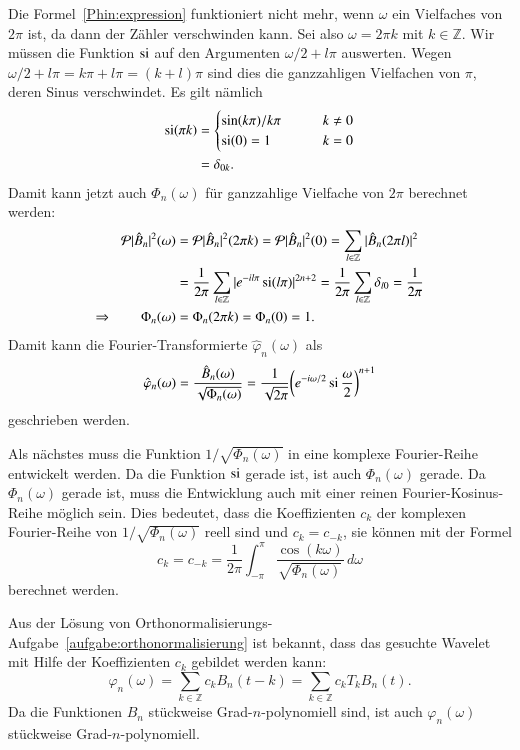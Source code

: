 Die Formel~\eqref{Phin:expression} funktioniert nicht mehr, wenn $\omega$
ein Vielfaches von $2\pi$ ist, da dann der Zähler verschwinden kann.
Sei also $\omega = 2\pi k$ mit $k\in\mathbb Z$.
Wir müssen die Funktion $\si$ auf den Argumenten
$\omega/2+l\pi$ auswerten.
Wegen $\omega/2 + l\pi=k\pi + l\pi = (k+l)\pi$ sind dies die ganzzahligen
Vielfachen von $\pi$, deren Sinus verschwindet.
Es gilt nämlich
\begin{align*}
\si (\pi k)
&=
\begin{cases}
\sin(k\pi)/k\pi&\qquad k\ne 0\\
\si(0)=1&\qquad k=0
\end{cases}
\\
&=
\delta_{0k}.
\end{align*}
Damit kann jetzt auch $\Phi_n(\omega)$ für ganzzahlige Vielfache von $2\pi$ 
berechnet werden:
\begin{align*}
\mathcal{P}|\hat{B}_n|^2(\omega)
&=
\mathcal{P}|\hat{B}_n|^2(2\pi k)
=
\mathcal{P}|\hat{B}_n|^2(0)
=
\sum_{l\in\mathbb Z} |\hat{B}_n(2\pi l)|^2
\\
&=
\frac1{2\pi}
\sum_{l\in\mathbb Z} |e^{-il\pi}\si(l\pi)|^{2n+2}
=
\frac1{2\pi}
\sum_{l\in\mathbb Z} \delta_{l0}
=
\frac1{2\pi}
\\
\Rightarrow\qquad
\Phi_n(\omega)
&=
\Phi_n(2\pi k)
=
\Phi_n(0)=1.
\end{align*}
Damit kann die Fourier-Transformierte $\hat{\varphi}_n(\omega)$ als
\[
\hat{\varphi}_n(\omega)
=
\frac{\hat{B}_n(\omega)}{\sqrt{\Phi_n(\omega)}}
=
\frac{1}{\sqrt{2\pi}}
\biggl(e^{-i\omega/2}\si\frac{\omega}2\biggr)^{n+1}
\]
geschrieben werden.

Als nächstes muss die Funktion $1/\sqrt{\Phi_n(\omega)}$ in eine komplexe
Fourier-Reihe entwickelt werden.
Da die Funktion $\si$ gerade ist, ist auch $\Phi_n(\omega)$ gerade.
Da $\Phi_n(\omega)$ gerade ist, muss die Entwicklung auch mit einer reinen
Fourier-Kosinus-Reihe möglich sein.
Dies bedeutet, dass die Koeffizienten $c_k$ der komplexen Fourier-Reihe
von $1/\sqrt{\Phi_n(\omega)}$ reell sind und $c_k=c_{-k}$,
sie können mit 
der Formel
\begin{equation}
c_k = c_{-k}
=
\frac{1}{2\pi}
\int_{-\pi}^{\pi}
\frac{\cos(k\omega)}{\sqrt{\Phi_n(\omega)}}
\,d\omega
\label{sqrtPhincoef}
\end{equation}
berechnet werden.

Aus der Lösung von
Orthonormalisierungs-Aufgabe~\ref{aufgabe:orthonormalisierung} ist bekannt,
dass das gesuchte Wavelet mit Hilfe der Koeffizienten $c_k$ gebildet werden 
kann:
\[
\varphi_n(\omega)
=
\sum_{k\in\mathbb Z}
c_k B_n(t-k)
=
\sum_{k\in\mathbb Z}
c_k T_kB_n(t).
\]
Da die Funktionen $B_n$ stückweise Grad-$n$-polynomiell sind, ist auch
$\varphi_n(\omega)$ stückweise Grad-$n$-po\-ly\-no\-miell.

